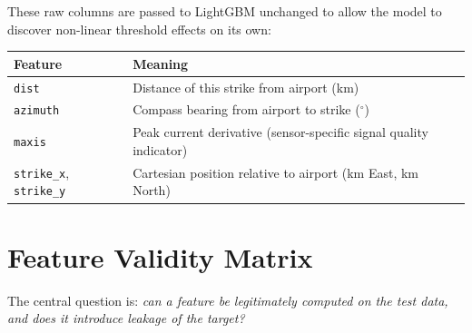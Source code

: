 \documentclass[12pt,a4paper]{article}
\begin{document}
These raw columns are passed to LightGBM unchanged to allow the model to discover non-linear threshold effects on its own:

\begin{center}
\begin{tabular}{L{3.5cm} L{9cm}}
\toprule
\textbf{Feature} & \textbf{Meaning} \\
\midrule
\texttt{dist}    & Distance of this strike from airport (km) \\
\texttt{azimuth} & Compass bearing from airport to strike ($^\circ$) \\
\texttt{maxis}   & Peak current derivative (sensor-specific signal quality indicator) \\
\texttt{strike\_x}, \texttt{strike\_y} & Cartesian position relative to airport (km East, km North) \\
\bottomrule
\end{tabular}
\end{center}

\newpage

\section{Feature Validity Matrix}

The central question is: \textit{can a feature be legitimately computed on the test data, and does it introduce leakage of the target?}
\end{document}

